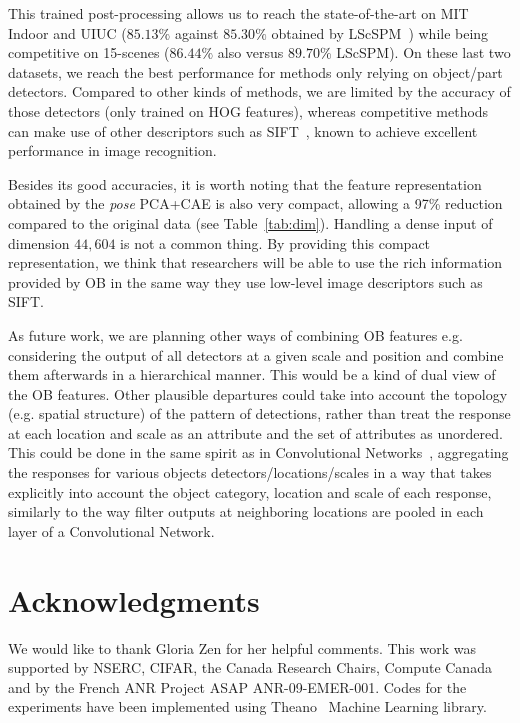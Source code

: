 \documentclass[runningheads,a4paper]{llncs}
\begin{document}
This trained post-processing allows us to reach the state-of-the-art on MIT
Indoor and UIUC ($85.13\%$ against $85.30\%$ obtained by LScSPM~\cite{Gao10})
while being competitive on 15-scenes ($86.44\%$ also versus $89.70\%$ LScSPM). 
%
On these last two datasets, we reach the best performance for methods only
relying on object/part detectors. Compared to other kinds of methods, we are
limited by the accuracy of those detectors (only trained on HOG features),
whereas competitive methods can make use of other descriptors such as
SIFT~\cite{Gao10}, known to achieve excellent performance in image recognition.


Besides its good accuracies, it is worth noting that the feature representation
obtained by the {\it pose} PCA+CAE is also very compact, allowing a 97\%
reduction compared to the original data (see Table~\ref{tab:dim}).  Handling a
dense input of dimension $44,604$ is not a common thing. By providing this
compact representation, we think that researchers will be able to use the rich
information provided by OB in the same way they use low-level image descriptors
such as SIFT.
 


As future work, we are planning other ways of combining OB features
e.g. considering the output of all detectors at a given scale and
position and combine them afterwards in a hierarchical manner.  This
would be a kind of dual view of the OB features. Other plausible
departures could take into account the topology (e.g. spatial
structure) of the pattern of detections, rather than treat the
response at each location and scale as an attribute and the set of
attributes as unordered. This could be done in the same spirit as in
Convolutional Networks~\cite{Lecun99objectrecognition}, aggregating
the responses for various objects detectors/locations/scales in a way
that takes explicitly into account the object category, location and
scale of each response, similarly to the way filter outputs at
neighboring locations are pooled in each layer of a Convolutional
Network.

\section{Acknowledgments} We would like to thank Gloria Zen for her helpful
comments.  This work was supported by NSERC, CIFAR, the Canada Research Chairs,
Compute Canada and by the French ANR Project ASAP ANR-09-EMER-001. Codes for
the experiments have been implemented using Theano~\cite{bergstra+al:2010-scipy} Machine Learning library.

%
%




\end{document}
